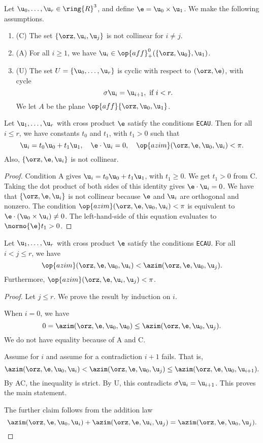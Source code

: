 \begin{remark}[ECAU]
Let $\u_0,\ldots,\u_r\in\ring{R}^3$, and define $\e = \u_0\times\u_1$.  We make
the following assumptions.
\begin{enumerate}
\item (C) The set $\{\orz,\u_i,\u_j\}$ is not collinear for $i\ne j$.
\item (A) For all $i\ge 1$, we have $\u_i\in \op{aff}_+^0(\{\orz,\u_0\},\u_1)$.
\item (U) The set $U = \{\u_0,\ldots,\u_r\}$ is cyclic with respect to $(\orz,\e)$, with cycle
\[
\sigma \u_i = \u_{i+1},\text { if } i< r.
\]
We let $A$ be the plane $\op{aff}\{\orz,\u_0,\u_1\}$.
\end{enumerate}
\end{remark}

\begin{lemma}[]  
Let $\u_1,\ldots,\u_r$ with cross product $\e$  satisfy the conditions {\tt ECAU}.  
Then for all $i\le r$, we have constants $t_0$ and $t_1$, with $t_1>0$ such that 
\[
\u_i = t_0 \u_0 + t_1 \u_1,\quad \e\cdot\u_i = 0,\quad \op{azim}(\orz,\e,\u_0,\u_i)<\pi.
\]
Also, $\{\orz,\e,\u_i\}$ is not collinear.
\end{lemma}

\begin{proof} Condition A gives $\u_i = t_0 \u_0 + t_1\u_1$, with $t_1\ge0$.  We get $t_1>0$ from C.
Taking the dot product of both sides of this identity gives $\e\cdot\u_i=0$.
We have that $\{\orz,\e,\u_i\}$ is not collinear because $\e$ and $\u_i$ are orthogonal and nonzero.
The condition $\op{azim}(\orz,\e,\u_0,\u_i)<\pi$ is equivalent to $\e\cdot (\u_0\times\u_i)\ne0$.
The left-hand-side of this equation evaluates to $\normo{\e}t_1 >0$.
\end{proof}

\begin{lemma}[]
Let $\u_1,\ldots,\u_r$ with cross product $\e$  satisfy the conditions {\tt ECAU}.  
For all $i<j\le r$, we have
\[
\op{azim}(\orz,\e,\u_0,\u_i)<\azim(\orz,\e,\u_0,\u_j).
\]
Furthermore, $\op{azim}(\orz,\e,\u_i,\u_j)<\pi$.
\end{lemma}

\begin{proof}
Let $j\le r$.  We prove the result by induction on $i$.

When $i=0$, we have
\[
0 = \azim(\orz,\e,\u_0,\u_0)\le \azim(\orz,\e,\u_0,\u_j).
\]
We do not have equality because of A and C.

Assume for $i$ and assume for a contradiction $i+1$ fails. 
That is,
\[
\azim(\orz,\e,\u_0,\u_i) < \azim(\orz,\e,\u_0,\u_j)\le \azim(\orz,\e,\u_0,\u_{i+1}).
\]
By AC, the inequality is strict.  By U, this contradicts $\sigma\u_i = \u_{i+1}$.
This proves the main statement.

The further claim follows from the addition law
\[
\azim(\orz,\e,\u_0,\u_i)+\azim(\orz,\e,\u_i,\u_j) = \azim(\orz,\e,\u_0,\u_j).
\]
\end{proof}

